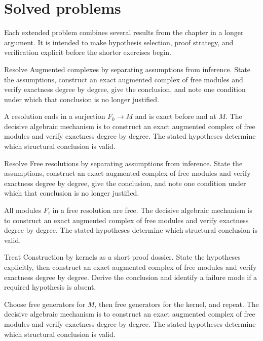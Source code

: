 \section{Solved problems}
Each extended problem combines several results from the chapter in a longer argument. It is intended to make hypothesis selection, proof strategy, and verification explicit before the shorter exercises begin.

\begin{problem}\label{prob:v23-problem-01}
Resolve Augmented complexes by separating assumptions from inference. State the assumptions, construct an exact augmented complex of free modules and verify exactness degree by degree, give the conclusion, and note one condition under which that conclusion is no longer justified.
\end{problem}
\begin{solution}
A resolution ends in a surjection $F_0\to M$ and is exact before and at $M$. The decisive algebraic mechanism is to construct an exact augmented complex of free modules and verify exactness degree by degree. The stated hypotheses determine which structural conclusion is valid.
\end{solution}

\begin{problem}\label{prob:v23-problem-02}
Resolve Free resolutions by separating assumptions from inference. State the assumptions, construct an exact augmented complex of free modules and verify exactness degree by degree, give the conclusion, and note one condition under which that conclusion is no longer justified.
\end{problem}
\begin{solution}
All modules $F_i$ in a free resolution are free. The decisive algebraic mechanism is to construct an exact augmented complex of free modules and verify exactness degree by degree. The stated hypotheses determine which structural conclusion is valid.
\end{solution}

\begin{problem}\label{prob:v23-problem-03}
Treat Construction by kernels as a short proof dossier. State the hypotheses explicitly, then construct an exact augmented complex of free modules and verify exactness degree by degree. Derive the conclusion and identify a failure mode if a required hypothesis is absent.
\end{problem}
\begin{solution}
Choose free generators for $M$, then free generators for the kernel, and repeat. The decisive algebraic mechanism is to construct an exact augmented complex of free modules and verify exactness degree by degree. The stated hypotheses determine which structural conclusion is valid.
\end{solution}


